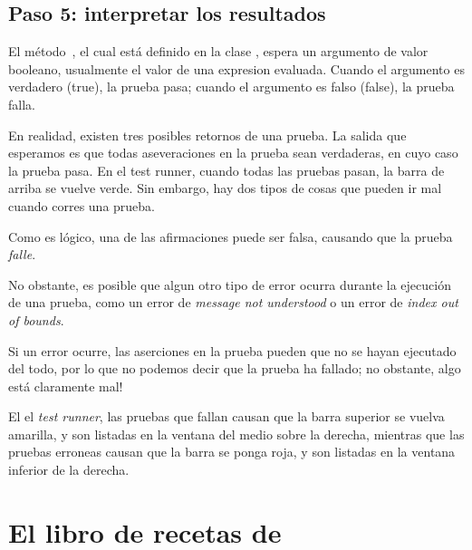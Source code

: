 \documentclass[a4paper,10pt,twoside]{book}
\begin{document}

\subsection{Paso 5: interpretar los resultados}

El m\'etodo \,, el cual est\'a definido en la clase
, espera un argumento de valor booleano, usualmente el valor de 
una expresion evaluada. Cuando el argumento es verdadero (true), la prueba pasa;
cuando el argumento es falso (false), la prueba falla.

En realidad, existen tres posibles retornos de una prueba.
La salida que esperamos es que todas aseveraciones en la prueba sean verdaderas, en cuyo caso la prueba pasa.
En el test runner, cuando todas las pruebas pasan, la barra de arriba se vuelve verde.
Sin embargo, hay dos tipos de cosas que pueden ir mal cuando corres una prueba.

Como es l\'ogico, una de las afirmaciones puede ser falsa, causando que la prueba \emph{falle}. 

No obstante, es posible que algun otro tipo de error ocurra durante la ejecuci\'on de una prueba,
como un error de \emph{message not understood} o un error de \emph{index out of bounds}.

Si un error ocurre, las aserciones en la prueba pueden que no se hayan ejecutado del todo, 
por lo que no podemos decir que la prueba ha fallado; no obstante, algo est\'a claramente mal!

El el \emph{test runner}, las pruebas que fallan causan que la barra superior se vuelva amarilla, 
y son listadas en la ventana del medio sobre la derecha, mientras que
las pruebas erroneas causan que la barra se ponga roja, y son listadas en la ventana inferior de la derecha.


\section{El libro de recetas de \SUnit }
\end{document}

